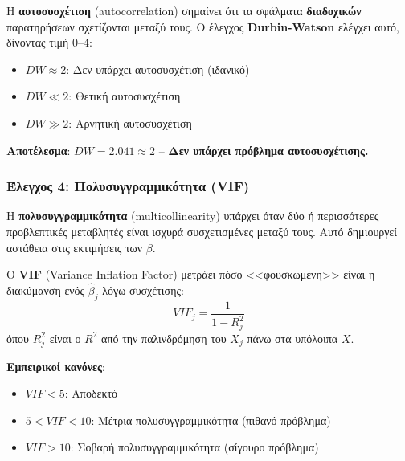 \documentclass[12pt,a4paper]{article}
\begin{document}
\begin{theorybox}
Η \textbf{αυτοσυσχέτιση} (autocorrelation) σημαίνει ότι τα σφάλματα \textbf{διαδοχικών} παρατηρήσεων σχετίζονται μεταξύ τους. Ο έλεγχος \textbf{Durbin-Watson} ελέγχει αυτό, δίνοντας τιμή 0--4:
\begin{itemize}
    \item $DW \approx 2$: Δεν υπάρχει αυτοσυσχέτιση (ιδανικό)
    \item $DW \ll 2$: Θετική αυτοσυσχέτιση
    \item $DW \gg 2$: Αρνητική αυτοσυσχέτιση
\end{itemize}
\end{theorybox}

\textbf{Αποτέλεσμα}: $DW = 2.041 \approx 2$ -- \textbf{Δεν υπάρχει πρόβλημα αυτοσυσχέτισης.}

\subsubsection{Έλεγχος 4: Πολυσυγγραμμικότητα (VIF)}

\begin{theorybox}
Η \textbf{πολυσυγγραμμικότητα} (multicollinearity) υπάρχει όταν δύο ή περισσότερες προβλεπτικές μεταβλητές είναι ισχυρά συσχετισμένες μεταξύ τους. Αυτό δημιουργεί αστάθεια στις εκτιμήσεις των $\beta$.

Ο \textbf{VIF} (Variance Inflation Factor) μετράει πόσο <<φουσκωμένη>> είναι η διακύμανση ενός $\hat{\beta}_j$ λόγω συσχέτισης:
\begin{equation}
VIF_j = \frac{1}{1 - R_j^2}
\end{equation}
όπου $R_j^2$ είναι ο $R^2$ από την παλινδρόμηση του $X_j$ πάνω στα υπόλοιπα $X$.

\textbf{Εμπειρικοί κανόνες}:
\begin{itemize}
    \item $VIF < 5$: Αποδεκτό
    \item $5 < VIF < 10$: Μέτρια πολυσυγγραμμικότητα (πιθανό πρόβλημα)
    \item $VIF > 10$: Σοβαρή πολυσυγγραμμικότητα (σίγουρο πρόβλημα)
\end{itemize}
\end{theorybox}
\end{document}
